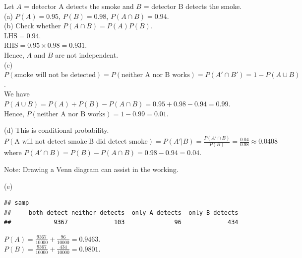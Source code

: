\documentclass[bigtut]{tutorial}\usepackage[]{graphicx}\usepackage[]{color}
\makeatletter
\newenvironment{kframe}{%
 \def\at@end@of@kframe{}%
 \ifinner\ifhmode%
  \def\at@end@of@kframe{\end{minipage}}%
  \begin{minipage}{\columnwidth}%
 \fi\fi%
 \def\FrameCommand##1{\hskip\@totalleftmargin \hskip-\fboxsep
 \colorbox{shadecolor}{##1}\hskip-\fboxsep
     \hskip-\linewidth \hskip-\@totalleftmargin \hskip\columnwidth}%
 \MakeFramed {\advance\hsize-\width
   \@totalleftmargin\z@ \linewidth\hsize
   \@setminipage}}%
 {\par\unskip\endMakeFramed%
 \at@end@of@kframe}
\newenvironment{knitrout}{}{} %
\makeatother
\begin{document}
\begin{tutorial}
\begin{questions}
\begin{parts}
\end{parts}


\begin{solution}
Let $A$ = detector A detects the smoke and $B$ = detector B detects the smoke. \\

(a) 
$P(A) = 0.95$, $P(B)=0.98$, $P(A \cap B)= 0.94$. \\

(b)
Check whether $P(A \cap B)=P(A)P(B)$. \\
$\text{LHS} = 0.94$. \\
$\text{RHS} = 0.95 \times 0.98=0.931$. \\
Hence, $A$ and $B$ are not independent. \\

(c)
$P(\text{smoke will not be detected}) = P(\text{neither A nor B works}) =  P(A' \cap B') = 1-P(A\cup B)$. \\
We have $P(A\cup B) = P(A)+P(B)-P(A\cap B) = 0.95+0.98-0.94 = 0.99$. \\
Hence, $P(\text{neither A nor B works}) = 1- 0.99 = 0.01$. 

\vspace{.5cm}
(d)
This is conditional probability. \\
$P(\text{A will not detect smoke}| \text{B did detect smoke}) 
= P(A' | B)
= \frac{ P(A' \cap B) }{ P(B)} = \frac{0.04}{0.98} \approx  0.0408$
where
$P(A'\cap B) = P(B)-P(A\cap B) = 0.98-0.94 = 0.04$.

\vspace{.5cm}
Note: Drawing a Venn diagram can assist in the working.

\vspace{.5cm}
(e)
\begin{knitrout}
\color{fgcolor}\begin{kframe}
\begin{verbatim}
## samp
##     both detect neither detects  only A detects  only B detects 
##            9367             103              96             434
\end{verbatim}
\end{kframe}
\end{knitrout}

$P(A) = \frac{9367}{10000} +  \frac{96}{10000} = 0.9463$. \\

$P(B) = \frac{9367}{10000} +  \frac{434}{10000} = 0.9801$. \\


\end{solution}
\end{questions}
\end{tutorial}
\end{document}
